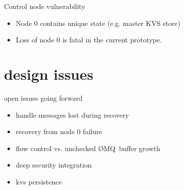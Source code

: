 \documentclass[default,pdf,colorBG,slideColor]{prosper}
\newcommand{\zMQ}{\O{}MQ}
\begin{document}
\begin{slide}{Control node vulnerability}{\small
\begin{itemize}
  \item{Node 0 contains unique state (e.g. master KVS store)}
  \item{Loss of node 0 is fatal in the current prototype.}
\end{itemize}
}\end{slide}

\part{design issues}

\begin{slide}{open issues going forward}{\small
\begin{itemize}
  \item{handle messages lost during recovery}
  \item{recovery from node 0 failure}
  \item{flow control vs. unchecked \zMQ\ buffer growth}
  \item{deep security integration}
  \item{kvs persistence}
\end{itemize}
}\end{slide}
\end{document}
